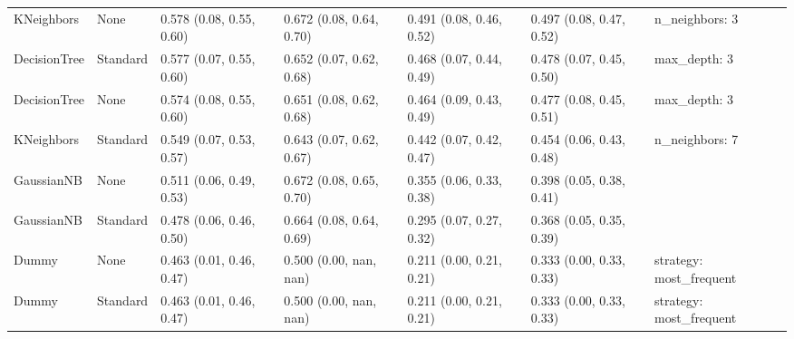 \begin{tabular}{lllllll}
KNeighbors & None & 0.578 (0.08, 0.55, 0.60) & 0.672 (0.08, 0.64, 0.70) & 0.491 (0.08, 0.46, 0.52) & 0.497 (0.08, 0.47, 0.52) & {{n\_neighbors: 3}} \\
DecisionTree & Standard & 0.577 (0.07, 0.55, 0.60) & 0.652 (0.07, 0.62, 0.68) & 0.468 (0.07, 0.44, 0.49) & 0.478 (0.07, 0.45, 0.50) & {{max\_depth: 3}} \\
DecisionTree & None & 0.574 (0.08, 0.55, 0.60) & 0.651 (0.08, 0.62, 0.68) & 0.464 (0.09, 0.43, 0.49) & 0.477 (0.08, 0.45, 0.51) & {{max\_depth: 3}} \\
KNeighbors & Standard & 0.549 (0.07, 0.53, 0.57) & 0.643 (0.07, 0.62, 0.67) & 0.442 (0.07, 0.42, 0.47) & 0.454 (0.06, 0.43, 0.48) & {{n\_neighbors: 7}} \\
GaussianNB & None & 0.511 (0.06, 0.49, 0.53) & 0.672 (0.08, 0.65, 0.70) & 0.355 (0.06, 0.33, 0.38) & 0.398 (0.05, 0.38, 0.41) & {{}} \\
GaussianNB & Standard & 0.478 (0.06, 0.46, 0.50) & 0.664 (0.08, 0.64, 0.69) & 0.295 (0.07, 0.27, 0.32) & 0.368 (0.05, 0.35, 0.39) & {{}} \\
Dummy & None & 0.463 (0.01, 0.46, 0.47) & 0.500 (0.00, nan, nan) & 0.211 (0.00, 0.21, 0.21) & 0.333 (0.00, 0.33, 0.33) & {{strategy: most\_frequent}} \\
Dummy & Standard & 0.463 (0.01, 0.46, 0.47) & 0.500 (0.00, nan, nan) & 0.211 (0.00, 0.21, 0.21) & 0.333 (0.00, 0.33, 0.33) & {{strategy: most\_frequent}} \\
\bottomrule
\end{tabular}
